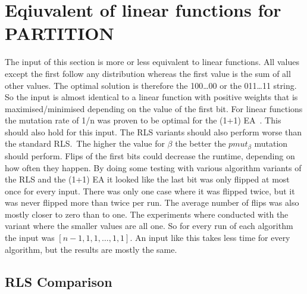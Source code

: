 \section{Eqiuvalent of linear functions for PARTITION}\label{evalSec:onemax}
The input of this section is more or less equivalent to linear functions. All values except the first follow any distribution whereas the first value is the sum of all other values.
The optimal solution is therefore the 100\dots00 or the 011\dots11 string.
So the input is almost identical to a linear function with positive weights that is maximised/minimised depending on the value of the first bit.\newline
For linear functions the mutation rate of 1/n was proven to be optimal for the (1+1) EA~\cite{witt2013tight}.
This should also hold for this input.
The RLS variants should also perform worse than the standard RLS.\
The higher the value for $\beta$ the better the $pmut_\beta$ mutation should perform.
Flips of the first bits could decrease the runtime, depending on how often they happen.
By doing some testing with various algorithm variants of the RLS and the (1+1) EA it looked like the last bit was only flipped at most once for every input.
There was only one case where it was flipped twice, but it was never flipped more than twice per run.
The average number of flips was also mostly closer to zero than to one.\newline
The experiments where conducted with the variant where the smaller values are all one.
So for every run of each algorithm the input was $[n-1, 1, 1, \dots, 1, 1]$.
An input like this takes less time for every algorithm, but the results are mostly the same.
\subsection{RLS Comparison}


